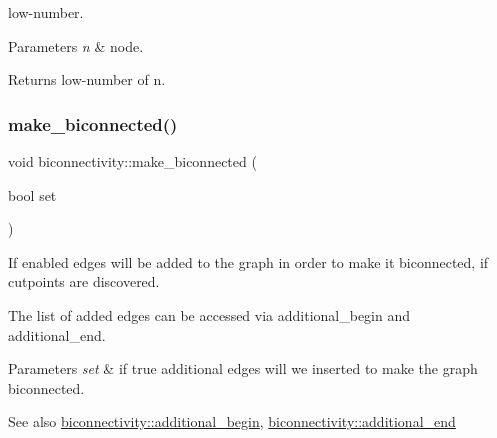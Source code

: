 low-\/number. 


\begin{DoxyParams}{Parameters}
{\em n} & node. \\
\hline
\end{DoxyParams}
\begin{DoxyReturn}{Returns}
low-\/number of n. 
\end{DoxyReturn}
\mbox{\label{classbiconnectivity_a774fd08203a6d164605afc4cdc8b9201}} 
\subsubsection{\texorpdfstring{make\+\_\+biconnected()}{make\_biconnected()}\hspace{0.1cm}{\footnotesize\ttfamily [1/2]}}
{\footnotesize\ttfamily void biconnectivity\+::make\+\_\+biconnected (\begin{DoxyParamCaption}\item[{bool}]{set }\end{DoxyParamCaption})\hspace{0.3cm}{\ttfamily [inline]}}



If enabled edges will be added to the graph in order to make it biconnected, if cutpoints are discovered. 

The list of added edges can be accessed via additional\+\_\+begin and additional\+\_\+end.


\begin{DoxyParams}{Parameters}
{\em set} & if true additional edges will we inserted to make the graph biconnected. \\
\hline
\end{DoxyParams}
\begin{DoxySeeAlso}{See also}
\mbox{\hyperlink{classbiconnectivity_ac5295da180114bffbbfd621d644d4c58}{biconnectivity\+::additional\+\_\+begin}}, \mbox{\hyperlink{classbiconnectivity_a447a86f387efd181b25b8bacf3365e75}{biconnectivity\+::additional\+\_\+end}} 
\end{DoxySeeAlso}
\mbox{\label{classbiconnectivity_a9ca9632a7fc398edb5b505dd0fe706c9}} 
